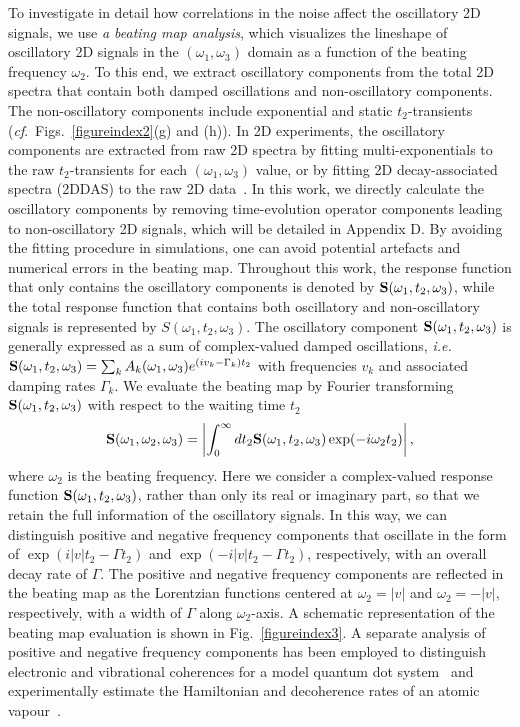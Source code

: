 \documentclass[%
 reprint,%
 amssymb, amsmath,%
 aip,cha,%
]{revtex4-1}
\newcommand{\abs}[1]{\left|#1\right|}
\begin{document}
To investigate in detail how correlations in the noise affect the oscillatory 2D signals, we use {\it a beating map analysis}, which visualizes the lineshape of oscillatory 2D signals in the $(\omega_1,\omega_3)$ domain as a function of the beating frequency $\omega_2$. To this end, we extract oscillatory components from the total 2D spectra that contain both damped oscillations and non-oscillatory components. The non-oscillatory components include exponential and static $t_2$-transients ({\it cf}.~Figs.~\ref{figureindex2}(g) and (h)). In 2D experiments, the oscillatory components are extracted from raw 2D spectra by fitting multi-exponentials to the raw $t_2$-transients for each $(\omega_1,\omega_3)$ value, or by fitting 2D decay-associated spectra (2DDAS) to the raw 2D data~\cite{RomeroNP2014,Fuller2014,MilotaJPCA2013,LimNC2015}. In this work, we directly calculate the oscillatory components by removing time-evolution operator components leading to non-oscillatory 2D signals, which will be detailed in Appendix D.  By avoiding the fitting procedure in simulations, one can avoid potential artefacts and numerical errors in the beating map.  Throughout this work, the response function that only contains the oscillatory components is denoted by ${\bf S}(\omega_1,t_2,\omega_3)$, while the total response function that contains both oscillatory and non-oscillatory signals is represented by $S(\omega_1,t_2,\omega_3)$. The oscillatory component ${\bf S}(\omega_1,t_2,\omega_3)$ is generally expressed as a sum of complex-valued damped oscillations, {\it i.e.}~${\bf S}(\omega_1,t_2,\omega_3)=\sum_{k}A_{k}(\omega_1,\omega_3) e^{(iv_k-\Gamma_k) t_2}$ with frequencies $v_k$ and associated damping rates $\Gamma_k$. We evaluate the beating map by Fourier transforming ${\bf S}(\omega_1,t_2,\omega_3)$ with respect to the waiting time $t_2$
\begin{equation}
	{\bf S}(\omega_1,\omega_2,\omega_3)=\abs{\int_{0}^{\infty}dt_2{\bf S}(\omega_1,t_2,\omega_3)\exp(-i\omega_2 t_2)},
\end{equation}
where $\omega_2$ is the beating frequency. Here we consider a complex-valued response function ${\bf S}(\omega_1,t_2,\omega_3)$, rather than only its real or imaginary part, so that we retain the full information of the oscillatory signals. In this way, we can distinguish positive and negative frequency components that oscillate in the form of $\exp(i\abs{v} t_2-\Gamma t_2)$ and $\exp(-i\abs{v} t_2-\Gamma t_2)$, respectively, with an overall decay rate of $\Gamma$. The positive and negative frequency components are reflected in the beating map as the Lorentzian functions centered at $\omega_2=\abs{v}$ and $\omega_2=-\abs{v}$, respectively, with a width of $\Gamma$ along $\omega_2$-axis. A schematic representation of the beating map evaluation is shown in Fig.~\ref{figureindex3}. A separate analysis of positive and negative frequency components has been employed to distinguish electronic and vibrational coherences for a model quantum dot system~\cite{SeibtJPCC2013} and experimentally estimate the Hamiltonian and decoherence rates of an atomic vapour~\cite{LiNC2013}.
\end{document}
